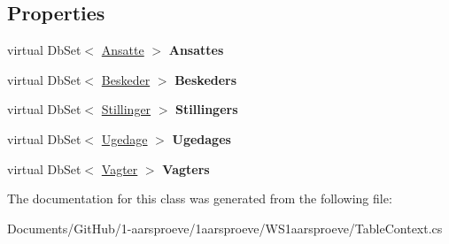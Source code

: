 \subsection*{Properties}
\begin{DoxyCompactItemize}
\item 
\hypertarget{class_w_s1aarsproeve_1_1_table_context_a6341a67f517a0bbc44f0fb068c4b7178}{}virtual Db\+Set$<$ \hyperlink{class_w_s1aarsproeve_1_1_ansatte}{Ansatte} $>$ {\bfseries Ansattes}\label{class_w_s1aarsproeve_1_1_table_context_a6341a67f517a0bbc44f0fb068c4b7178}

\item 
\hypertarget{class_w_s1aarsproeve_1_1_table_context_a5ccb14602b884e3e7c6dce2b807e2d4a}{}virtual Db\+Set$<$ \hyperlink{class_w_s1aarsproeve_1_1_beskeder}{Beskeder} $>$ {\bfseries Beskeders}\label{class_w_s1aarsproeve_1_1_table_context_a5ccb14602b884e3e7c6dce2b807e2d4a}

\item 
\hypertarget{class_w_s1aarsproeve_1_1_table_context_a4892255183f924e549c6d71fe6df046b}{}virtual Db\+Set$<$ \hyperlink{class_w_s1aarsproeve_1_1_stillinger}{Stillinger} $>$ {\bfseries Stillingers}\label{class_w_s1aarsproeve_1_1_table_context_a4892255183f924e549c6d71fe6df046b}

\item 
\hypertarget{class_w_s1aarsproeve_1_1_table_context_a11f7dc9477816840e89a32cc595fc67b}{}virtual Db\+Set$<$ \hyperlink{class_w_s1aarsproeve_1_1_ugedage}{Ugedage} $>$ {\bfseries Ugedages}\label{class_w_s1aarsproeve_1_1_table_context_a11f7dc9477816840e89a32cc595fc67b}

\item 
\hypertarget{class_w_s1aarsproeve_1_1_table_context_a248f8738fc860dbf42457335a01636d5}{}virtual Db\+Set$<$ \hyperlink{class_w_s1aarsproeve_1_1_vagter}{Vagter} $>$ {\bfseries Vagters}\label{class_w_s1aarsproeve_1_1_table_context_a248f8738fc860dbf42457335a01636d5}

\end{DoxyCompactItemize}


The documentation for this class was generated from the following file\+:\begin{DoxyCompactItemize}
\item 
Documents/\+Git\+Hub/1-\/aarsproeve/1aarsproeve/\+W\+S1aarsproeve/Table\+Context.\+cs\end{DoxyCompactItemize}
